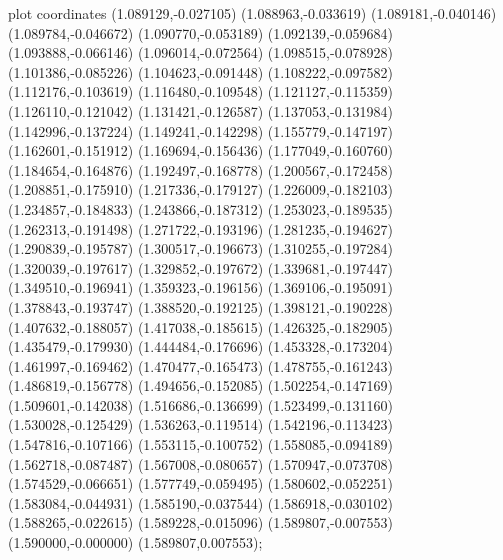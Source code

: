 { plot coordinates {(1.089129,-0.027105) (1.088963,-0.033619) (1.089181,-0.040146) (1.089784,-0.046672) (1.090770,-0.053189) (1.092139,-0.059684) (1.093888,-0.066146) (1.096014,-0.072564) (1.098515,-0.078928) (1.101386,-0.085226) (1.104623,-0.091448) (1.108222,-0.097582) (1.112176,-0.103619) (1.116480,-0.109548) (1.121127,-0.115359) (1.126110,-0.121042) (1.131421,-0.126587) (1.137053,-0.131984) (1.142996,-0.137224) (1.149241,-0.142298) (1.155779,-0.147197) (1.162601,-0.151912) (1.169694,-0.156436) (1.177049,-0.160760) (1.184654,-0.164876) (1.192497,-0.168778) (1.200567,-0.172458) (1.208851,-0.175910) (1.217336,-0.179127) (1.226009,-0.182103) (1.234857,-0.184833) (1.243866,-0.187312) (1.253023,-0.189535) (1.262313,-0.191498) (1.271722,-0.193196) (1.281235,-0.194627) (1.290839,-0.195787) (1.300517,-0.196673) (1.310255,-0.197284) (1.320039,-0.197617) (1.329852,-0.197672) (1.339681,-0.197447) (1.349510,-0.196941) (1.359323,-0.196156) (1.369106,-0.195091) (1.378843,-0.193747) (1.388520,-0.192125) (1.398121,-0.190228) (1.407632,-0.188057) (1.417038,-0.185615) (1.426325,-0.182905) (1.435479,-0.179930) (1.444484,-0.176696) (1.453328,-0.173204) (1.461997,-0.169462) (1.470477,-0.165473) (1.478755,-0.161243) (1.486819,-0.156778) (1.494656,-0.152085) (1.502254,-0.147169) (1.509601,-0.142038) (1.516686,-0.136699) (1.523499,-0.131160) (1.530028,-0.125429) (1.536263,-0.119514) (1.542196,-0.113423) (1.547816,-0.107166) (1.553115,-0.100752) (1.558085,-0.094189) (1.562718,-0.087487) (1.567008,-0.080657) (1.570947,-0.073708) (1.574529,-0.066651) (1.577749,-0.059495) (1.580602,-0.052251) (1.583084,-0.044931) (1.585190,-0.037544) (1.586918,-0.030102) (1.588265,-0.022615) (1.589228,-0.015096) (1.589807,-0.007553) (1.590000,-0.000000) (1.589807,0.007553)};
}
